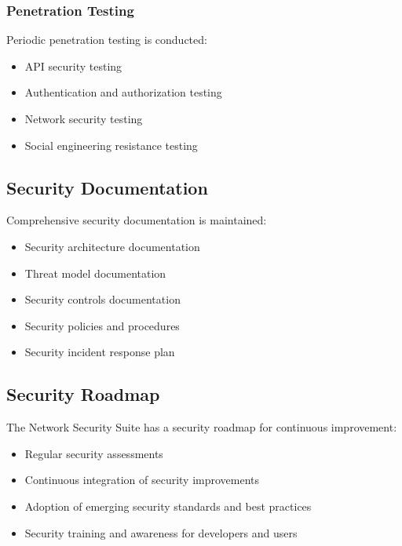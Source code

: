 \subsubsection{Penetration Testing}
Periodic penetration testing is conducted:

\begin{itemize}
    \item API security testing
    \item Authentication and authorization testing
    \item Network security testing
    \item Social engineering resistance testing
\end{itemize}

\subsection{Security Documentation}
Comprehensive security documentation is maintained:

\begin{itemize}
    \item Security architecture documentation
    \item Threat model documentation
    \item Security controls documentation
    \item Security policies and procedures
    \item Security incident response plan
\end{itemize}

\subsection{Security Roadmap}
The Network Security Suite has a security roadmap for continuous improvement:

\begin{itemize}
    \item Regular security assessments
    \item Continuous integration of security improvements
    \item Adoption of emerging security standards and best practices
    \item Security training and awareness for developers and users
\end{itemize}